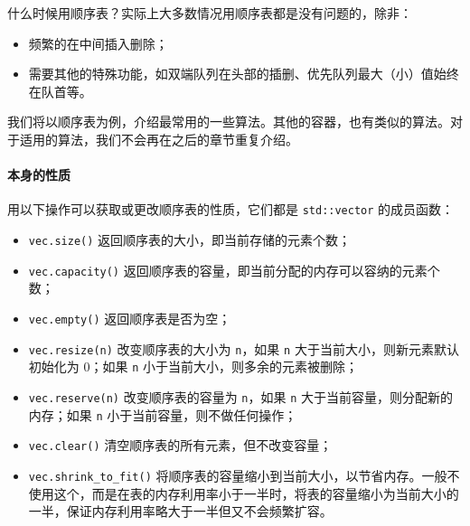 什么时候用顺序表？实际上大多数情况用顺序表都是没有问题的，除非：
\begin{itemize}
    \item 频繁的在中间插入删除；
    \item 需要其他的特殊功能，如双端队列在头部的插删、优先队列最大（小）值始终在队首等。
\end{itemize}

我们将以顺序表为例，介绍最常用的一些算法。其他的容器，也有类似的算法。对于适用的算法，我们不会再在之后的章节重复介绍。

\paragraph{本身的性质} 用以下操作可以获取或更改顺序表的性质，它们都是 \verb|std::vector| 的成员函数：
\begin{itemize}
    \item \verb|vec.size()| 返回顺序表的大小，即当前存储的元素个数；
    \item \verb|vec.capacity()| 返回顺序表的容量，即当前分配的内存可以容纳的元素个数；
    \item \verb|vec.empty()| 返回顺序表是否为空；
    \item \verb|vec.resize(n)| 改变顺序表的大小为 \verb|n|，如果 \verb|n| 大于当前大小，则新元素默认初始化为 0；如果 \verb|n| 小于当前大小，则多余的元素被删除；
    \item \verb|vec.reserve(n)| 改变顺序表的容量为 \verb|n|，如果 \verb|n| 大于当前容量，则分配新的内存；如果 \verb|n| 小于当前容量，则不做任何操作；
    \item \verb|vec.clear()| 清空顺序表的所有元素，但不改变容量；
    \item \verb|vec.shrink_to_fit()| 将顺序表的容量缩小到当前大小，以节省内存。一般不使用这个，而是在表的内存利用率小于一半时，将表的容量缩小为当前大小的一半，保证内存利用率略大于一半但又不会频繁扩容。
\end{itemize}

